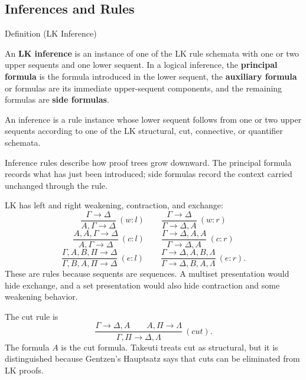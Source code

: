 \subsection{Inferences and Rules}

\begin{definitionbox}{Definition (LK Inference)}
\begin{definition}[LK Inference]\label{def:lk-inference}
An \textbf{LK inference} is an instance of one of the LK rule schemata with
one or two upper sequents and one lower sequent. In a logical inference, the
\textbf{principal formula} is the formula introduced in the lower sequent, the
\textbf{auxiliary formula} or formulas are its immediate upper-sequent
components, and the remaining formulas are \textbf{side formulas}.
\end{definition}
\end{definitionbox}

\begin{remark*}
An inference is a rule instance whose lower sequent follows from one or two
upper sequents according to one of the LK structural, cut, connective, or
quantifier schemata.
\end{remark*}

\begin{remark*}[Interpretation]
Inference rules describe how proof trees grow downward. The principal formula
records what has just been introduced; side formulas record the context
carried unchanged through the rule.
\end{remark*}

\begin{remark*}[Exposition]
LK has left and right weakening, contraction, and exchange:
\[
\frac{\Gamma \to \Delta}{A,\Gamma \to \Delta}\ (w:l)
\qquad
\frac{\Gamma \to \Delta}{\Gamma \to \Delta,A}\ (w:r)
\]
\[
\frac{A,A,\Gamma \to \Delta}{A,\Gamma \to \Delta}\ (c:l)
\qquad
\frac{\Gamma \to \Delta,A,A}{\Gamma \to \Delta,A}\ (c:r)
\]
\[
\frac{\Gamma,A,B,\Pi \to \Delta}{\Gamma,B,A,\Pi \to \Delta}\ (e:l)
\qquad
\frac{\Gamma \to \Delta,A,B,\Lambda}{\Gamma \to \Delta,B,A,\Lambda}\ (e:r).
\]
These are rules because sequents are sequences. A multiset presentation would
hide exchange, and a set presentation would also hide contraction and some
weakening behavior.
\end{remark*}

\begin{remark*}[Exposition]
The cut rule is
\[
\frac{\Gamma \to \Delta,A \qquad A,\Pi \to \Lambda}
     {\Gamma,\Pi \to \Delta,\Lambda}\ (cut).
\]
The formula $A$ is the cut formula. Takeuti treats cut as structural, but it is
distinguished because Gentzen's Hauptsatz says that cuts can be eliminated
from LK proofs.
\end{remark*}

